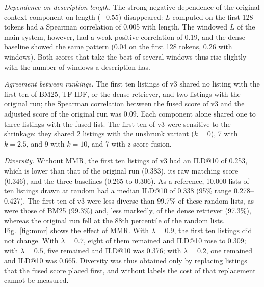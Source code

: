 \documentclass[CHICAGO]{USG}
\begin{document}
\emph{Dependence on description length.} The strong negative dependence of the original context component on length ($-0.55$) disappeared: $L$ computed on the first 128 tokens had a Spearman correlation of 0.005 with length. The windowed $L$ of the main system, however, had a weak positive correlation of 0.19, and the dense baseline showed the same pattern (0.04 on the first 128 tokens, 0.26 with windows). Both scores that take the best of several windows thus rise slightly with the number of windows a description has. %

\emph{Agreement between rankings.} The first ten listings of v3 shared no listing with the first ten of BM25, TF-IDF, or the dense retriever, and two listings with the original run; the Spearman correlation between the fused score of v3 and the adjusted score of the original run was 0.09. %
Each component alone shared one to three listings with the fused list. The first ten of v3 were sensitive to the shrinkage: they shared 2 listings with the unshrunk variant ($k=0$), 7 with $k=2.5$, and 9 with $k=10$, and 7 with z-score fusion. %

\emph{Diversity.} Without MMR, the first ten listings of v3 had an ILD@10 of 0.253, which is lower than that of the original run (0.383), its raw matching score (0.346), and the three baselines (0.265 to 0.306). %
As a reference, 10{,}000 lists of ten listings drawn at random had a median ILD@10 of 0.338 (95\% range 0.278--0.427). The first ten of v3 were less diverse than 99.7\% of these random lists, as were those of BM25 (99.3\%) and, less markedly, of the dense retriever (97.3\%), whereas the original run fell at the 88th percentile of the random lists. %
Fig.~\ref{fig:mmr} shows the effect of MMR. With $\lambda=0.9$, the first ten listings did not change. With $\lambda=0.7$, eight of them remained and ILD@10 rose to 0.309; with $\lambda=0.5$, five remained and ILD@10 was 0.376; with $\lambda=0.2$, one remained and ILD@10 was 0.665. %
Diversity was thus obtained only by replacing listings that the fused score placed first, and without labels the cost of that replacement cannot be measured.
\end{document}
